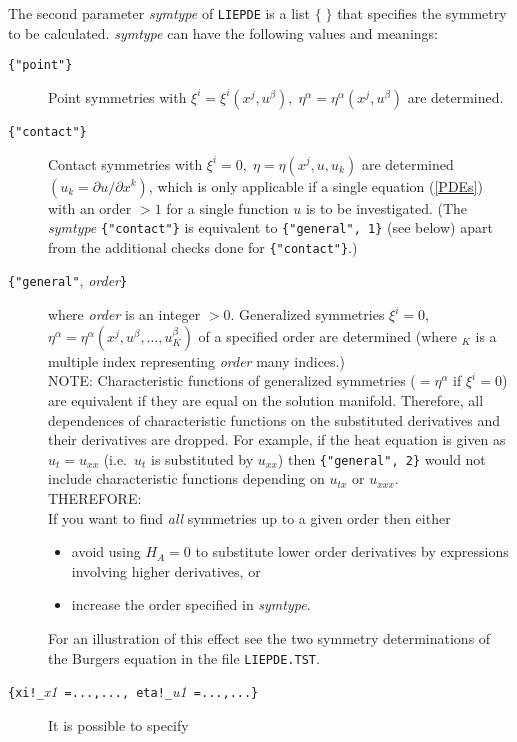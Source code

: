 The second parameter \textit{symtype} of \texttt{LIEPDE} is a list $\{\;\}$ that
specifies the symmetry to be calculated. \textit{symtype} can have the following
values and meanings:
\begin{description}
\item[\texttt{\{"point"\}}] Point symmetries with
  $\xi^i=\xi^i(x^j,u^{\beta}),\;
  \eta^{\alpha}=\eta^{\alpha}(x^j,u^{\beta})$ are determined.
\item[\texttt{\{"contact"\}}] Contact symmetries with
  $\xi^i=0,\;\eta=\eta(x^j,u,u_k)$ are determined $(u_k = \partial
  u/\partial x^k)$, which is only applicable if a single equation
  (\ref{PDEs}) with an order $>1$ for a single function $u$ is to be
  investigated.  (The \textit{symtype} \verb+{"contact"}+ is
  equivalent to \verb+{"general", 1}+ (see below) apart from the
  additional checks done for \verb+{"contact"}+.)
\item[\texttt{\{"general"}, \textit{order}\texttt{\}}] where \textit{order}
  is an integer $>0$.  Generalized symmetries $\xi^i=0,$
  $\eta^{\alpha}=\eta^{\alpha}(x^j,u^{\beta},\ldots,u^{\beta}_K)$ of a
  specified order are determined (where $_K$ is a multiple index
  representing \textit{order} many indices.) \\
  NOTE: Characteristic functions of generalized symmetries ($=
  \eta^{\alpha}$ if $\xi^i=0$) are equivalent if they are equal on the
  solution manifold.  Therefore, all dependences of characteristic
  functions on the substituted derivatives and their derivatives are
  dropped.  For example, if the heat equation is given as $u_t=u_{xx}$
  (i.e.\ $u_t$ is substituted by $u_{xx}$) then \verb+{"general", 2}+
  would not include characteristic functions depending on $u_{tx}$ or
  $u_{xxx}$. \\
  THEREFORE: \\
  If you want to find \textit{all} symmetries up to a given order then
  either
  \begin{itemize}
  \item avoid using $H_A=0$ to substitute lower order derivatives by
    expressions involving higher derivatives, or
  \item increase the order specified in \textit{symtype}.
  \end{itemize}
  For an illustration of this effect see the two symmetry
  determinations of the Burgers equation in the file \texttt{LIEPDE.TST}.
\item[\texttt{\{xi!\_}\textit{x1}\texttt{ =...,...,
    eta!\_}\textit{u1}\texttt{ =...,...\}}] It is possible to specify

\end{description}
